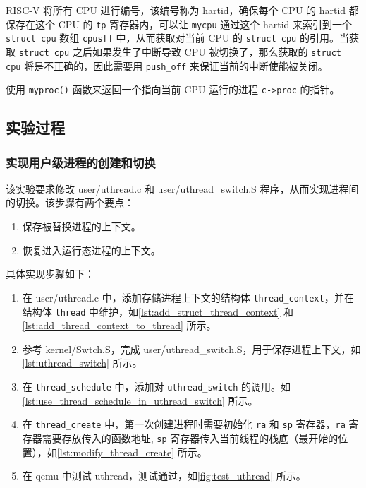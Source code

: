 RISC-V 将所有 CPU 进行编号，该编号称为 hartid，确保每个 CPU 的 hartid 都保存在这个 CPU 的 \texttt{tp} 寄存器内，可以让 \texttt{mycpu} 通过这个 hartid 来索引到一个 \texttt{struct cpu} 数组 \texttt{cpus[]} 中，从而获取对当前 CPU 的 \texttt{struct cpu} 的引用。当获取 \texttt{struct cpu} 之后如果发生了中断导致 CPU 被切换了，那么获取的 \texttt{struct cpu} 将是不正确的，因此需要用 \texttt{push\_off} 来保证当前的中断使能被关闭。

使用 \texttt{myproc()} 函数来返回一个指向当前 CPU 运行的进程 \texttt{c->proc} 的指针。

\subsection{实验过程}

\subsubsection{实现用户级进程的创建和切换}

该实验要求修改 user/uthread.c 和 user/uthread\_switch.S 程序，从而实现进程间的切换。该步骤有两个要点：

\begin{enumerate}
	\item 保存被替换进程的上下文。 
	\item 恢复进入运行态进程的上下文。 
\end{enumerate}

具体实现步骤如下：

\begin{enumerate}
	\item 在 user/uthread.c 中，添加存储进程上下文的结构体 \texttt{thread\_context}，并在 结构体 \texttt{thread} 中维护，如\cref{lst:add_struct_thread_context} 和  \cref{lst:add_thread_context_to_thread} 所示。
	\item 参考 kernel/Swtch.S，完成 user/uthread\_switch.S，用于保存进程上下文，如\cref{lst:uthread_switch} 所示。
	\item 在 \texttt{thread\_schedule} 中，添加对 \texttt{uthread\_switch} 的调用。如\cref{lst:use_thread_schedule_in_uthread_switch} 所示。
	\item 在 \texttt{thread\_create} 中，第一次创建进程时需要初始化 \texttt{ra} 和 \texttt{sp} 寄存器，\texttt{ra} 寄存器需要存放传入的函数地址, \texttt{sp} 寄存器传入当前线程的栈底（最开始的位置），如\cref{lst:modify_thread_create} 所示。
	\item 在 qemu 中测试 uthread，测试通过，如\cref{fig:test_uthread} 所示。
\end{enumerate}

